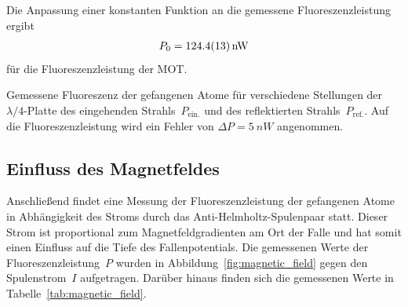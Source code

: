 \documentclass[11pt, a4paper]{article}
\numberwithin{equation}{section}
\begin{document}
Die Anpassung einer konstanten Funktion an die gemessene Fluoreszenzleistung ergibt
\begin{align*}
P_0 = \SI{124.4 +- 1.3}{nW}
\end{align*}
für die Fluoreszenzleistung der MOT.

\begin{table}
	\centering
	
	\caption{Gemessene Fluoreszenz der gefangenen Atome für verschiedene Stellungen der $\lambda / 4$-Platte des eingehenden Strahls~$P_\mathrm{ein.}$ und des reflektierten Strahls~$P_\mathrm{ref.}$. Auf die Fluoreszenzleistung wird ein Fehler von $\Delta P = \SI{5}{nW}$ angenommen.}
	\label{tab:lambda_4}
\end{table}


\subsection{Einfluss des Magnetfeldes}
Anschließend findet eine Messung der Fluoreszenzleistung der gefangenen Atome in Abhängigkeit des Stroms durch das Anti-Helmholtz-Spulenpaar statt.
Dieser Strom ist proportional zum Magnetfeldgradienten am Ort der Falle und hat somit einen Einfluss auf die Tiefe des Fallenpotentials.
Die gemessenen Werte der Fluoreszenzleistung~$P$ wurden in Abbildung~\ref{fig:magnetic_field} gegen den Spulenstrom~$I$ aufgetragen.
Darüber hinaus finden sich die gemessenen Werte in Tabelle~\ref{tab:magnetic_field}.
\end{document}
